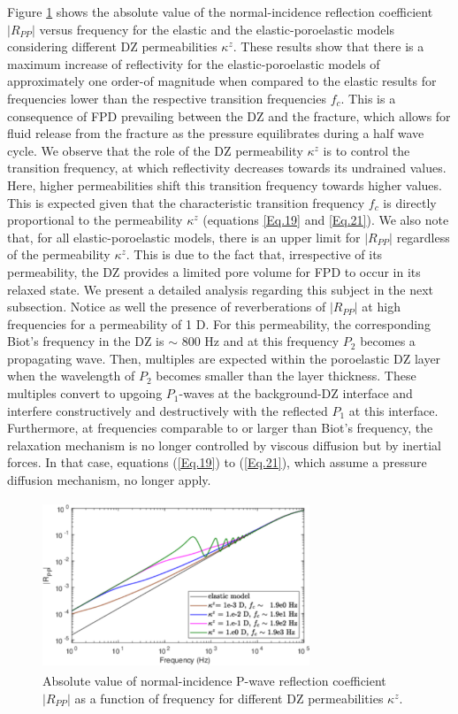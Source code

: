 \documentclass[draft]{agujournal2019}
\begin{document}
Figure \ref{fig:2} shows the absolute value of the normal-incidence reflection coefficient $|R_{PP}|$ versus frequency for the elastic and the elastic-poroelastic models considering different DZ permeabilities $\kappa^z$. These results show that there is a maximum increase of reflectivity for the elastic-poroelastic models of approximately one order-of magnitude when compared to the elastic results for frequencies lower than the respective transition frequencies $f_c$. This is a consequence of FPD prevailing between the DZ and the fracture, which allows for fluid release from the fracture as the pressure equilibrates during a half wave cycle. 
We observe that the role of the DZ permeability $\kappa^z$ is to control the transition frequency, at which reflectivity decreases towards its undrained values. Here, higher permeabilities shift this transition frequency towards higher values. This is expected given that the characteristic transition frequency $f_c$ is directly proportional to the permeability $\kappa^z$ (equations \ref{Eq.19} and \ref{Eq.21}). We also note that, for all elastic-poroelastic models, there is an upper limit for $|R_{PP}|$ regardless of the permeability $\kappa^z$. This is due to the fact that, irrespective of its permeability, the DZ provides a limited pore volume for FPD to occur in its relaxed state. We present a detailed analysis regarding this subject in the next subsection. Notice as well the presence of reverberations of $|R_{PP}|$ at high frequencies for a permeability of 1 D. For this permeability, the corresponding Biot's frequency in the DZ is $ \sim$ 800 Hz and at this frequency $P_2$ becomes a propagating wave. Then, multiples are expected within the poroelastic DZ layer when the wavelength of $P_2$ becomes smaller than the layer thickness. These multiples convert to upgoing $P_1$-waves at the background-DZ interface and interfere constructively and destructively with the reflected $P_1$ at this interface. Furthermore, at frequencies comparable to or larger than Biot's frequency, the relaxation mechanism is no longer controlled  by viscous diffusion but by inertial forces. In that case, equations (\ref{Eq.19}) to (\ref{Eq.21}), which assume a pressure diffusion mechanism, no longer apply.

\begin{figure}
\centering
        \includegraphics[width=80mm, height=50mm]{Figure2.pdf}
\caption {Absolute value of normal-incidence P-wave reflection coefficient $|R_{PP}|$ as a function of frequency for different DZ permeabilities $\kappa^z$.}
\label{fig:2}
\end{figure}
\end{document}
